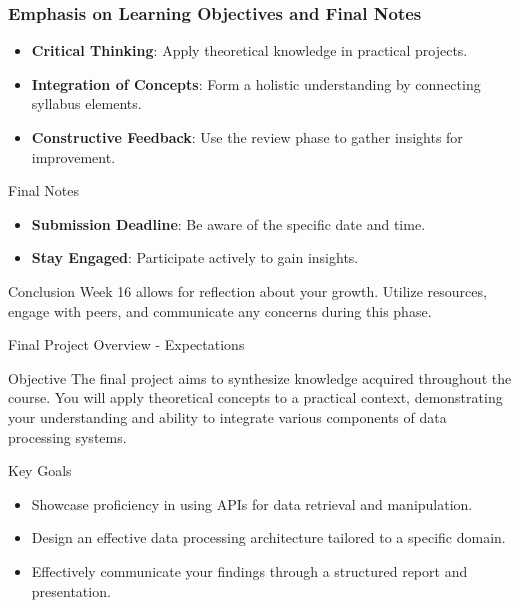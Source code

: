\documentclass[aspectratio=169]{beamer}
\begin{document}
\begin{frame}[fragile]
    \frametitle{Emphasis on Learning Objectives and Final Notes}
    \begin{itemize}
        \item \textbf{Critical Thinking}: Apply theoretical knowledge in practical projects.
        \item \textbf{Integration of Concepts}: Form a holistic understanding by connecting syllabus elements.
        \item \textbf{Constructive Feedback}: Use the review phase to gather insights for improvement.
    \end{itemize}

    \begin{block}{Final Notes}
        \begin{itemize}
            \item \textbf{Submission Deadline}: Be aware of the specific date and time.
            \item \textbf{Stay Engaged}: Participate actively to gain insights.
        \end{itemize}
    \end{block}

    \begin{block}{Conclusion}
        Week 16 allows for reflection about your growth. Utilize resources, engage with peers, and communicate any concerns during this phase.
    \end{block}
\end{frame}

\begin{frame}[fragile]{Final Project Overview - Expectations}
    \begin{block}{Objective}
        The final project aims to synthesize knowledge acquired throughout the course. You will apply theoretical concepts to a practical context, demonstrating your understanding and ability to integrate various components of data processing systems.
    \end{block}
    
    \begin{block}{Key Goals}
       \begin{itemize}
           \item Showcase proficiency in using APIs for data retrieval and manipulation.
           \item Design an effective data processing architecture tailored to a specific domain.
           \item Effectively communicate your findings through a structured report and presentation.
       \end{itemize}
    \end{block}
\end{frame}
\end{document}
